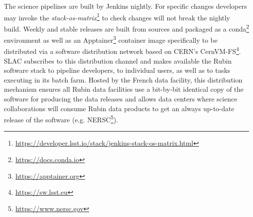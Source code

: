The science pipelines are built by Jenkins nightly.
For specific changes developers may invoke the \emph{stack-os-matrix}\footnote{\url{https://developer.lsst.io/stack/jenkins-stack-os-matrix.html}} to check changes will not break the nightly build. Weekly and stable releases are built from sources and packaged as a conda\footnote{\url{https://docs.conda.io}} environment as well as an Apptainer\footnote{\url{https://apptainer.org}} container image specifically to be distributed via a software distribution network based on CERN's CernVM-FS\footnote{\url{https://sw.lsst.eu}}. SLAC subscribes to this distribution channel and makes available the Rubin software stack to pipeline developers, to individual users, as well as to tasks executing in its batch farm. Hosted by the French data facility, this distribution mechanism ensures all Rubin data facilities use a bit-by-bit identical copy of the software for producing the data releases and allows data centers where science collaborations will consume Rubin data products to get an always up-to-date release of the software (e.g. NERSC\footnote{\url{https://www.nersc.gov}}).
